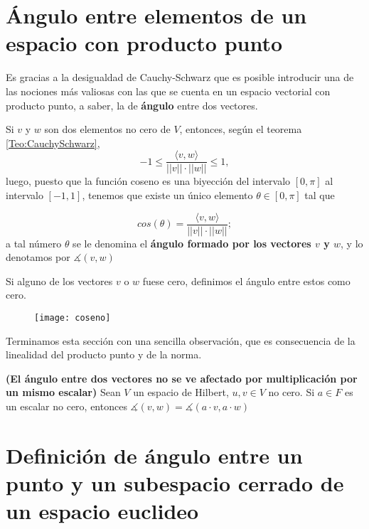\section{Ángulo entre elementos de un espacio con producto punto}
\label{angulo entre elementos de un espacio con producto punto}

Es gracias a la desigualdad de Cauchy-Schwarz
que es posible introducir una de las nociones
más valiosas con las que se cuenta en un espacio
vectorial con producto punto, a saber, la de \textbf{ángulo} entre dos
vectores.

Si $v$ y $w$ son dos elementos no cero de $V$, entonces,
según el teorema \ref{Teo:CauchySchwarz},
\[
-1 \leq \frac{\langle v, w \rangle}{||v|| \cdot ||w||} \leq 1,
\]
luego, puesto que la función coseno es una biyección
del intervalo $[0, \pi]$ al intervalo $[-1,1]$,
tenemos que existe un único elemento 
$\theta \in [0, \pi]$ tal que

\[
cos(\theta)= \frac{\langle v, w \rangle}{||v|| \cdot ||w||};
\]
a tal número $\theta$ se le denomina el 
\textbf{ángulo formado por los vectores $v$ y $w$},
y lo denotamos por $\measuredangle (v, w)$

Si alguno de los vectores $v$ o $w$ fuese cero, definimos
el ángulo entre estos como cero.

\begin{figure}[H]
	\centering
	\texttt{[image: coseno]} 
\end{figure}	


Terminamos esta sección con una sencilla observación, que es 
consecuencia de la linealidad del producto punto y de la norma.

\begin{obs}
\label{obs: angulo se preserva por mult. esc.}
\textbf{(El ángulo entre dos vectores no se ve afectado
por multiplicación por un mismo escalar)}
Sean $V$ un espacio de Hilbert, $u, v \in V$ no cero.
Si $a \in F$ es un escalar no cero, entonces
$\measuredangle (v, w) = \measuredangle (a \cdot v, a \cdot w)$
\end{obs}

\section{Definición de ángulo entre un punto y un subespacio cerrado de un espacio euclideo}
\label{sec: def del angulo entre un punto y un subespacio cerrado}


